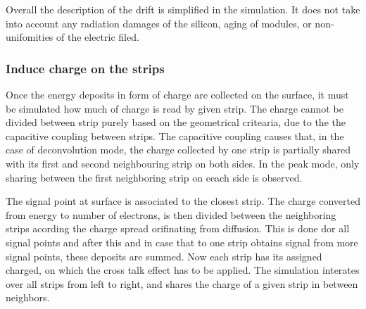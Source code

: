 Overall the description of the drift is simplified in the simulation. It does not take into account any radiation damages of the silicon, aging of modules, or non-unifomities of the electric filed.


\subsubsection{Induce charge on the strips~\label{sec:induce}}


Once the energy deposits in form of charge are collected on the surface, it must be simulated how much of charge is read by given strip. The charge cannot be divided between strip purely based on the geometrical critearia, due to the the capacitive coupling between strips. The capacitive coupling causes that, in the case of deconvolution mode, the charge collected by one strip is partially shared with its first and second neighbouring strip on both sides. In the peak mode, only sharing between the first neighboring strip on eeach side is observed.   

The signal point at surface is associated to the closest strip. The charge converted from energy to number of electrons, is then divided between the neighboring strips acording the charge spread orifinating from diffusion. This is done dor all signal points and after this and in case that to one strip obtains signal from more signal points, these deposits are summed. Now each strip has its assigned charged, on which the cross talk effect has to be applied. The simulation interates over all strips from left to right, and shares the charge of a given strip in between neighbors.

